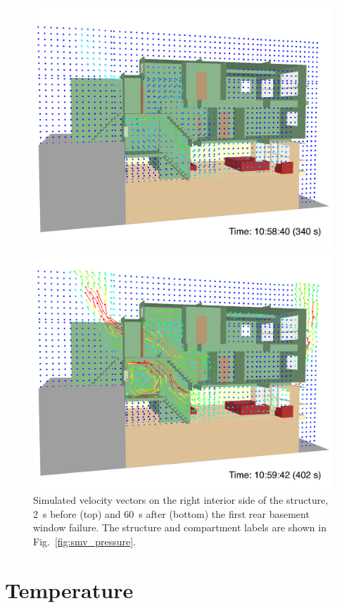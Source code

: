 \documentclass[12pt,oneside]{book}
\begin{document}
\begin{figure}[!ht]
\includegraphics[width=4.5in]{../Figures/SMV_Vel_Vec_340_s}


\includegraphics[width=4.5in]{../Figures/SMV_Vel_Vec_402_s}


\caption[Simulated velocity vectors on the right interior side of the structure.]
{Simulated velocity vectors on the right interior side of the structure, 2~s before (top) and 60~s after (bottom) the first rear basement window failure. The structure and compartment labels are shown in Fig.~\ref{fig:smv_pressure}.}
\label{fig:smv_velocity_vectors}
\end{figure}


\clearpage


\section{Temperature}
\label{sec:temperature}
\end{document}
